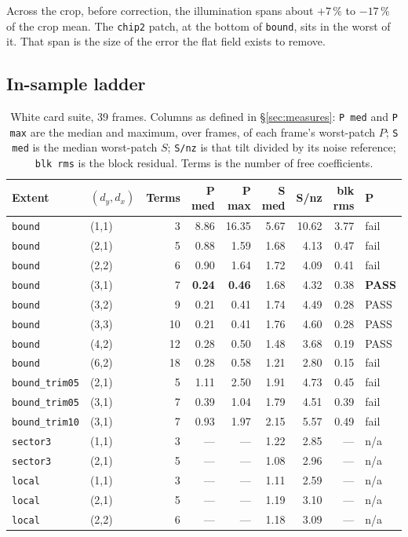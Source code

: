 \documentclass[11pt, a4paper]{article}
\newcommand{\code}[1]{\texttt{#1}}
\newcommand{\pct}{\,\%}
\begin{document}
Across the crop, before correction,
the illumination spans about $+7\pct$ to $-17\pct$ of the crop mean.
The \code{chip2} patch, at the bottom of \code{bound},
sits in the worst of it.
That span is the size of the error the flat field exists to remove.

\subsection{In-sample ladder}

\begin{table}[htbp]
\centering
\caption{White card suite, 39 frames.
Columns as defined in \S\ref{sec:measures}:
\code{P med} and \code{P max} are the median and maximum,
over frames, of each frame's worst-patch $P$;
\code{S med} is the median worst-patch $S$;
\code{S/nz} is that tilt divided by its noise reference;
\code{blk rms} is the block residual.
Terms is the number of free coefficients.}
\label{tab:ladder-white}
\begin{tabular}{llrrrrrrl}
\toprule
Extent & $(d_y,d_x)$ & Terms & P med & P max & S med & S/nz & blk rms & P \\
\midrule
\code{bound} & (1,1) &  3 & 8.86 & 16.35 & 5.67 & 10.62 & 3.77 & fail \\
\code{bound} & (2,1) &  5 & 0.88 &  1.59 & 1.68 &  4.13 & 0.47 & fail \\
\code{bound} & (2,2) &  6 & 0.90 &  1.64 & 1.72 &  4.09 & 0.41 & fail \\
\code{bound} & (3,1) &  7 & \textbf{0.24} & \textbf{0.46} & 1.68 & 4.32 & 0.38 & \textbf{PASS} \\
\code{bound} & (3,2) &  9 & 0.21 &  0.41 & 1.74 &  4.49 & 0.28 & PASS \\
\code{bound} & (3,3) & 10 & 0.21 &  0.41 & 1.76 &  4.60 & 0.28 & PASS \\
\code{bound} & (4,2) & 12 & 0.28 &  0.50 & 1.48 &  3.68 & 0.19 & PASS \\
\code{bound} & (6,2) & 18 & 0.28 &  0.58 & 1.21 &  2.80 & 0.15 & fail \\
\midrule
\code{bound\_trim05} & (2,1) & 5 & 1.11 & 2.50 & 1.91 & 4.73 & 0.45 & fail \\
\code{bound\_trim05} & (3,1) & 7 & 0.39 & 1.04 & 1.79 & 4.51 & 0.39 & fail \\
\code{bound\_trim10} & (3,1) & 7 & 0.93 & 1.97 & 2.15 & 5.57 & 0.49 & fail \\
\midrule
\code{sector3} & (1,1) & 3 & --- & --- & 1.22 & 2.85 & --- & n/a \\
\code{sector3} & (2,1) & 5 & --- & --- & 1.08 & 2.96 & --- & n/a \\
\code{local}   & (1,1) & 3 & --- & --- & 1.11 & 2.59 & --- & n/a \\
\code{local}   & (2,1) & 5 & --- & --- & 1.19 & 3.10 & --- & n/a \\
\code{local}   & (2,2) & 6 & --- & --- & 1.18 & 3.09 & --- & n/a \\
\bottomrule
\end{tabular}
\end{table}
\end{document}
